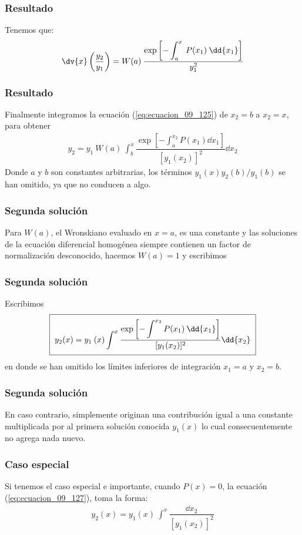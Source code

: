 \begin{frame}
\frametitle{Resultado}
Tenemos que:
\begin{align}
\dv{x} \left( \dfrac{y_{2}}{y_{1}} \right) =  W(a) \: \dfrac{\exp \left[\displaystyle - \int_{a}^{x} \: P(x_{1}) \: \dd{x_{1}} \right]}{y^{2}_{1}}
\label{eq:ecuacion_09_125}
\end{align}
\end{frame}
\begin{frame}
\frametitle{Resultado}
Finalmente integramos la ecuación (\ref{eq:ecuacion_09_125}) de $x_{2} = b$ a $x_{2} = x$, para obtener
\begin{align}
y_{2} = y_{1} \: W(a) \: \int_{b}^{x} \dfrac{\exp \left[ \displaystyle - \int_{a}^{x_{2}} P(x_{1}) \dd{x_{1}} \right]}{[y_{1}(x_{2})]^{2}} \dd{x_{2}}
\label{eq:ecuacion_09_126}
\end{align}
Donde $a$ y $b$ son constantes arbitrarias, los términos $y_{1}(x)y_{2}(b)/y_{1}(b)$ se han omitido, ya que no conducen a algo.
\end{frame}
\begin{frame}
\frametitle{Segunda solución}
Para $W(a)$, el Wronskiano evaluado en $x=a$, es una constante y las soluciones de la ecuación diferencial homogénea siempre contienen un factor de normalización desconocido, hacemos $W(a)=1$ y escribimos
\end{frame}
\begin{frame}
\frametitle{Segunda solución}
Escribimos
\begin{align}
\setlength{\fboxsep}{2\fboxsep}\boxed{y_{2}(x) =  y_{1} \: (x) \int^{x} \dfrac{\exp \left[ \displaystyle - \int^{x_{2}} P(x_{1}) \: \dd{x_{1}} \right]}{[y_{1}(x_{2})]^{2}} \dd{x_{2}}}
\label{eq:ecuacion_09_127}
\end{align}
en donde se han omitido los límites inferiores de integración $x_{1} = a$ y $x_{2}=b$.
\end{frame}
\begin{frame}
\frametitle{Segunda solución}
En caso contrario, simplemente originan una contribución igual a una constante multiplicada por al primera solución conocida $y_{1}(x)$ lo cual consecuentemente no agrega nada nuevo.
\end{frame}
\begin{frame}
\frametitle{Caso especial}
Si tenemos el caso especial e importante, cuando $P(x) = 0$, la ecuación (\ref{eq:ecuacion_09_127}), toma la forma:
\begin{align}
y_{2}(x) =  y_{1}(x) \: \int^{x} \dfrac{\dd{x_{2}}}{[y_{1}(x_{2})]^{2}}
\label{eq:ecuacion_09_128}
\end{align}
\end{frame}
